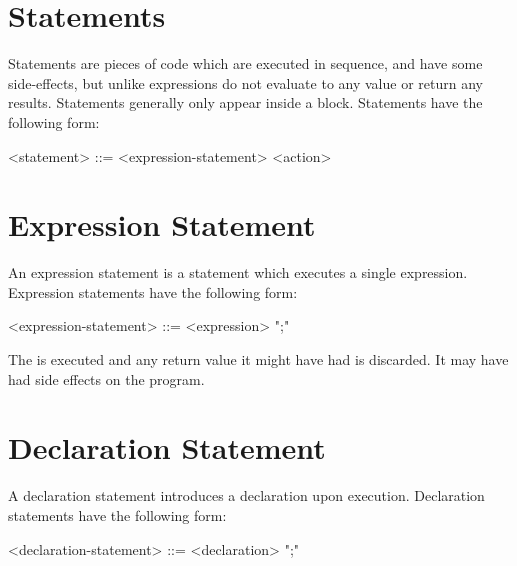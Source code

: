 \section{Statements} \label{guide:statements}

Statements are pieces of code which are executed in sequence, and have some side-effects, but unlike expressions do not evaluate to any value or return any results. Statements generally only appear inside a block. Statements have the following form:

\begin{minip}
\begin{grammar}
<statement> ::=
<expression-statement>
\alt <action>
\end{grammar}
\end{minip}

\section{Expression Statement} \label{guide:expr_stmt}

An expression statement is a statement which executes a single expression. Expression statements have the following form:

\begin{minip}
\begin{grammar}
<expression-statement> ::=
<expression> ";"
\end{grammar}
\end{minip}

The  is executed and any return value it might have had is discarded. It may have had side effects on the program.

\section{Declaration Statement} \label{guide:decl_stmt}

A declaration statement introduces a declaration upon execution. Declaration statements have the following form:

\begin{minip}
\begin{grammar}
<declaration-statement> ::=
<declaration> ";"
\end{grammar}
\end{minip}

